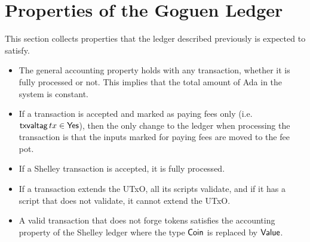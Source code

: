 \section{Properties of the Goguen Ledger}
\label{sec:properties}

This section collects properties that the ledger described previously is expected to satisfy.

\begin{itemize}
\item The general accounting property holds with any transaction,
  whether it is fully processed or not. This implies that the total
  amount of Ada in the system is constant.
\item If a transaction is accepted and marked as paying fees only
  (i.e. $\mathsf{txvaltag}\, tx \in \mathsf{Yes}$), then the only change to the ledger
  when processing the transaction is that the inputs marked for paying
  fees are moved to the fee pot.
\item If a Shelley transaction is accepted, it is fully processed.
\item If a transaction extends the UTxO, all its scripts validate, and
  if it has a script that does not validate, it cannot extend the
  UTxO.
\item A valid transaction that does not forge tokens satisfies the
  accounting property of the Shelley ledger where the type $\mathsf{Coin}$ is
  replaced by $\mathsf{Value}$.
\end{itemize}
